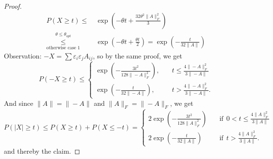 \begin{theorem}
\begin{proof}
\begin{equation*}
\begin{split}
P(X\geq t) \leq \ & \exp\left(
-\theta t + \frac{32 \theta^2 \|A\|_F^2}{3}
\right) \\
\underset{\text{otherwise case 1}}{\overset{\theta\leq\theta_{opt}}{\leq}} \  &
\exp \left(
-\theta t + \frac{\theta t}{2} 
\right)
= \exp\left(-\frac{t}{32\|A\|}\right)
\end{split}
\end{equation*}
Observation: $-X = \sum \varepsilon_i \varepsilon_j A_{ij}$, so by the same proof, we get $$P(-X \geq t) \leq \begin{cases}
\exp	\left( - \frac{3t^2}{128\|-A\|_F^2} \right), \quad & t\leq  \frac{4\|-A\|_F^2}{3\|-A\|}  \\
\exp\left(	- \frac{t}{32\|-A\|}		\right),\quad &t > \frac{4\|-A\|_F^2}{3\|-A\|}.
\end{cases}$$
And since $\|A\|=\|-A\|$ and $\|A\|_F = \|-A\|_F$, we get
\begin{equation*}
P(|X|\geq t) \leq 
P(X\geq t) + P(X \leq -t)=
\begin{cases}
2 \exp \left(-
\frac{3t^2}{128\|A\|_F^2}
\right) \quad &\text{if}\ \  0<t\leq \frac{4\|A\|_F^2}{3\|A\|}\\
2\exp \left(
- \frac{t}{32\|A\|}
\right) \quad & \text{if}\ \   t > \frac{4\|A\|_F^2}{3\|A\|}.
\end{cases}
\end{equation*}
and thereby the claim.
\end{proof}
\end{theorem}
